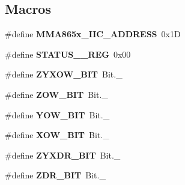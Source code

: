 \subsection*{Macros}
\begin{DoxyCompactItemize}
\item 
\hypertarget{group___engduino_accelerometer_gaa3d114a8f3ee77c8aec055baeffc08ab}{}\#define {\bfseries M\+M\+A865x\+\_\+\+I\+I\+C\+\_\+\+A\+D\+D\+R\+E\+S\+S}~0x1\+D\label{group___engduino_accelerometer_gaa3d114a8f3ee77c8aec055baeffc08ab}

\item 
\hypertarget{group___engduino_accelerometer_ga139d66868f0d3dcc69d282e779ff2df2}{}\#define {\bfseries S\+T\+A\+T\+U\+S\+\_\+\_\+\+R\+E\+G}~0x00\label{group___engduino_accelerometer_ga139d66868f0d3dcc69d282e779ff2df2}

\item 
\hypertarget{group___engduino_accelerometer_gab7703c366de670a45f9742176ba14732}{}\#define {\bfseries Z\+Y\+X\+O\+W\+\_\+\+B\+I\+T}~Bit.\+\_\label{group___engduino_accelerometer_gab7703c366de670a45f9742176ba14732}

\item 
\hypertarget{group___engduino_accelerometer_ga468c9f3650d1d44d8d42b1f1f9ec0efa}{}\#define {\bfseries Z\+O\+W\+\_\+\+B\+I\+T}~Bit.\+\_\label{group___engduino_accelerometer_ga468c9f3650d1d44d8d42b1f1f9ec0efa}

\item 
\hypertarget{group___engduino_accelerometer_ga15c2c3bbe9c5a950688f8d3628d37e34}{}\#define {\bfseries Y\+O\+W\+\_\+\+B\+I\+T}~Bit.\+\_\label{group___engduino_accelerometer_ga15c2c3bbe9c5a950688f8d3628d37e34}

\item 
\hypertarget{group___engduino_accelerometer_gaa95771862960ad4abd45117a266e2041}{}\#define {\bfseries X\+O\+W\+\_\+\+B\+I\+T}~Bit.\+\_\label{group___engduino_accelerometer_gaa95771862960ad4abd45117a266e2041}

\item 
\hypertarget{group___engduino_accelerometer_gade7a6e74b28a08453c284ed8c6af1e38}{}\#define {\bfseries Z\+Y\+X\+D\+R\+\_\+\+B\+I\+T}~Bit.\+\_\label{group___engduino_accelerometer_gade7a6e74b28a08453c284ed8c6af1e38}

\item 
\hypertarget{group___engduino_accelerometer_gaac7d3cc28a4c6514322fcf77d9e7c3c8}{}\#define {\bfseries Z\+D\+R\+\_\+\+B\+I\+T}~Bit.\+\_\label{group___engduino_accelerometer_gaac7d3cc28a4c6514322fcf77d9e7c3c8}


\end{DoxyCompactItemize}
